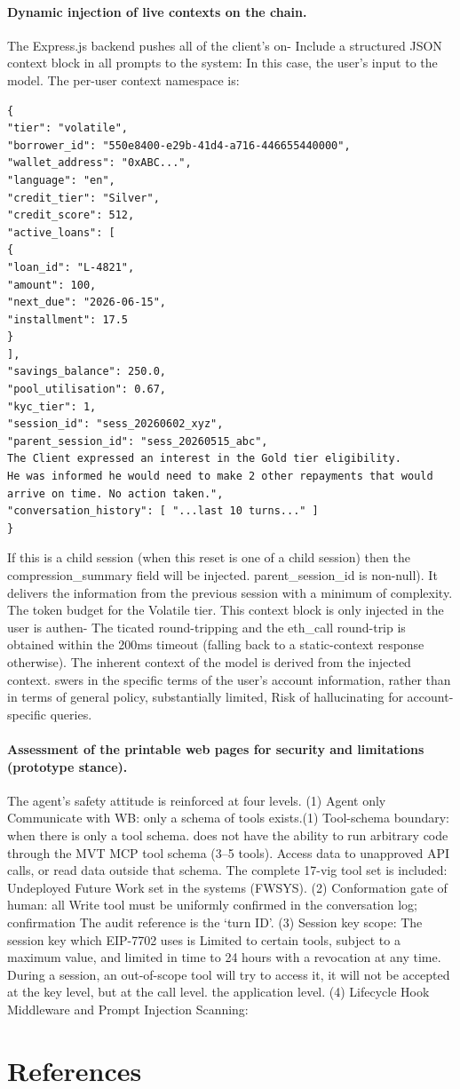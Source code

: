 \documentclass[12pt,a4paper]{article}
\begin{document}
\paragraph{Dynamic injection of live contexts on the chain.}
The Express.js backend pushes all of the client's on- Include a structured JSON context block in all prompts to the system: In this case, the user's input to the model. The per-user context namespace is:
\begin{verbatim}
{
"tier": "volatile",
"borrower_id": "550e8400-e29b-41d4-a716-446655440000",
"wallet_address": "0xABC...",
"language": "en",
"credit_tier": "Silver",
"credit_score": 512,
"active_loans": [
{
"loan_id": "L-4821",
"amount": 100,
"next_due": "2026-06-15",
"installment": 17.5
}
],
"savings_balance": 250.0,
"pool_utilisation": 0.67,
"kyc_tier": 1,
"session_id": "sess_20260602_xyz",
"parent_session_id": "sess_20260515_abc",
The Client expressed an interest in the Gold tier eligibility.
He was informed he would need to make 2 other repayments that would arrive on time. No action taken.",
"conversation_history": [ "...last 10 turns..." ]
}
\end{verbatim}
If this is a child session (when this reset is one of a child session) then the compression\_summary field will be injected. parent\_session\_id is non-null). It delivers the information from the previous session with a minimum of complexity. The token budget for the Volatile tier. This context block is only injected in the user is authen- The ticated round-tripping and the eth\_call round-trip is obtained within the 200ms timeout (falling back to a static-context response otherwise). The inherent context of the model is derived from the injected context. swers in the specific terms of the user's account information, rather than in terms of general policy, substantially limited, Risk of hallucinating for account-specific queries.

\paragraph{Assessment of the printable web pages for security and limitations (prototype stance).}
The agent's safety attitude is reinforced at four levels. (1) Agent only Communicate with WB: only a schema of tools exists.(1) Tool-schema boundary: when there is only a tool schema. does not have the ability to run arbitrary code through the MVT MCP tool schema (3--5 tools). Access data to unapproved API calls, or read data outside that schema. The complete 17-vig tool set is included: Undeployed Future Work set in the systems (FWSYS). (2) Conformation gate of human: all Write tool must be uniformly confirmed in the conversation log; confirmation The audit reference is the `turn ID'. (3) Session key scope: The session key which EIP-7702 uses is Limited to certain tools, subject to a maximum value, and limited in time to 24 hours with a revocation at any time. During a session, an out-of-scope tool will try to access it, it will not be accepted at the key level, but at the call level. the application level. (4) Lifecycle Hook Middleware and Prompt Injection Scanning:

\newpage
\section*{References}

\end{document}
